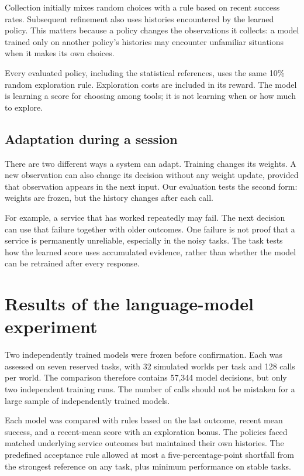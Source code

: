 \documentclass{strategynet-journal}
\begin{document}
\begin{SNcolumns}
Collection initially mixes random choices with a rule based on recent success
rates. Subsequent refinement also uses histories encountered by the learned
policy. This matters because a policy changes the observations it collects:
a model trained only on another policy's histories may encounter unfamiliar
situations when it makes its own choices.

Every evaluated policy, including the statistical references, uses the same
10\% random exploration rule. Exploration costs are included in its reward.
The model is learning a score for choosing among tools; it is not learning
when or how much to explore.

\subsection{Adaptation during a session}

There are two different ways a system can adapt. Training changes its weights.
A new observation can also change its decision without any weight update,
provided that observation appears in the next input. Our evaluation tests the
second form: weights are frozen, but the history changes after each call.

For example, a service that has worked repeatedly may fail. The next decision
can use that failure together with older outcomes. One failure is not proof
that a service is permanently unreliable, especially in the noisy tasks.
The task tests how the learned score uses accumulated evidence, rather than
whether the model can be retrained after every response.

\end{SNcolumns}
\section{Results of the language-model experiment}

Two independently trained models were frozen before confirmation. Each was
assessed on seven reserved tasks, with 32 simulated worlds per task and 128
calls per world. The comparison therefore contains 57,344 model decisions,
but only two independent training runs. The number of calls should not be
mistaken for a large sample of independently trained models.

Each model was compared with rules based on the last outcome, recent mean
success, and a recent-mean score with an exploration bonus. The policies faced
matched underlying service outcomes but maintained their own histories. The
predefined acceptance rule allowed at most a five-percentage-point shortfall
from the strongest reference on any task, plus minimum performance on stable
tasks.
\end{document}
